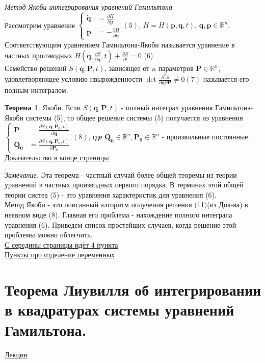 \documentclass[specialist, subf, href, colorlinks=true, 12pt, times, mtpro, final]{disser}
\theoremstyle{definition}
\newtheorem{theorem}{Теорема}[section]
\begin{document}
\textit{Метод Якоби интегрирования уравнений Гамильтона}\\
Рассмотрим уравнение $\left \lbrace
\begin{matrix}
\dot{\mathbf{q}} &= \frac{\partial H}{\partial \mathbf{p}}\\
\dot{\mathbf{p}} &= -\frac{\partial H}{\partial \mathbf{q}}
\end{matrix}
\right.(5)
$, $H = H(\mathbf{p}, \mathbf{q}, t)$, $\mathbf{q},\mathbf{p} \in \mathbb{R}^n.$\\
Соответствующим уравнением Гамильтона-Якоби называется уравнение в частных производных $H(\mathbf{q},\frac{\partial S}{\partial \mathbf{q}}, t) + \frac{\partial S}{\partial t} = 0$	(6)\\
Семейство решений $S(\mathbf{q},\mathbf{P}, t)$, зависящее от $n$ параметров $\mathbf{P} \in \mathbb{R}^n$, удовлетворяющее условию нвырожденности $\det \frac{\partial^2 S}{\partial \mathbf{q} \partial \mathbf{P}} \neq 0 (7)$ называется его полным интегралом.
\begin{theorem}Якоби. Если $S(\mathbf{q},\mathbf{P}, t)$ - полный интеграл уравнения Гамильтона-Якоби системы (5), то общее решение системы (5) получается из уравнения $\left \lbrace \begin{matrix}
\mathbf{P} &= \frac{\partial S(\mathbf{q},\mathbf{P_0}, t)}{\partial \mathbf{q}}\\
\mathbf{Q_0} &= \frac{\partial S(\mathbf{q},\mathbf{P_0}, t)}{\partial \mathbf{P_0}}
\end{matrix}
\right . (8)
$, где $\mathbf{Q_0} \in \mathbb{R}^n, \mathbf{P_0} \in \mathbb{R}^n$ - произвольные постоянные. \hyperlink {lects.33}{Доказательство в конце страницы}
\end{theorem}
\textit{Замечание.} Эта теорема - частный случай более общей теоремы из теории уравнений в частных производных первого порядка. В терминах этой общей теории систеа (5) - это уравнения характеристик для уравнения (6).\\
Метод Якоби - это описанный алгоритм получения решения (11)(из Док-ва) в неявном виде (8). Главная его проблема - нахождение полного интеграла уравнения (6). Приведем список простейших случаев, когда решение этой проблемы можно облегчить.\\
\hyperlink {lects.34}{С середины страницы идёт 4 пункта} \\
\hyperlink {lects.35}{Пункты про отделение переменных} \\
    
    \section{Теорема Лиувилля об интегрировании в квадратурах системы уравнений Гамильтона.}
     \label{21}
    \hyperlink {lects.37}{Лекции} \\
    
\end{document}
